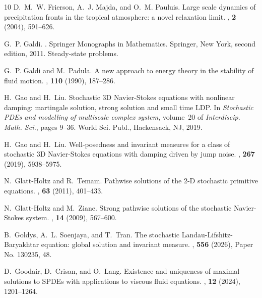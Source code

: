\documentclass[11pt, reqno]{amsart}
\theoremstyle{definition}
\numberwithin{equation}{section}
\begin{document}
\begin{thebibliography}{10}
	D.~M.~W. Frierson, A.~J. Majda, and O.~M. Pauluis.
	\newblock Large scale dynamics of precipitation fronts in the tropical
	atmosphere: a novel relaxation limit.
	,  {\bf 2} (2004), 591--626.
	
	G.~P. Galdi.
	.
	\newblock Springer Monographs in Mathematics. Springer, New York, second
	edition, 2011.
	\newblock Steady-state problems.
	
	G.~P. Galdi and M.~Padula.
	\newblock A new approach to energy theory in the stability of fluid motion.
	,  {\bf 110} (1990), 187--286.
	
	H.~Gao and H.~Liu.
	\newblock Stochastic 3{D} {N}avier-{S}tokes equations with nonlinear damping:
	martingale solution, strong solution and small time {LDP}.
	\newblock In {\em Stochastic {PDE}s and modelling of multiscale complex
		system}, volume~20 of {\em Interdiscip. Math. Sci.}, pages 9--36. World Sci.
	Publ., Hackensack, NJ, 2019.
	
	H.~Gao and H.~Liu.
	\newblock Well-posedness and invariant measures for a class of stochastic 3{D}
	{N}avier-{S}tokes equations with damping driven by jump noise.
	,  {\bf 267} (2019), 5938--5975.
	
	N.~Glatt-Holtz and R.~Temam.
	\newblock Pathwise solutions of the 2-{D} stochastic primitive equations.
	,  {\bf 63} (2011), 401--433.
	
	N.~Glatt-Holtz and M.~Ziane.
	\newblock Strong pathwise solutions of the stochastic {N}avier-{S}tokes system.
	,  {\bf 14} (2009), 567--600.
	
	B.~Goldys, A.~L. Soenjaya, and T.~Tran.
	\newblock The stochastic {L}andau-{L}ifshitz-{B}aryakhtar equation: global
	solution and invariant measure.
	,  {\bf 556} (2026), Paper No. 130235, 48.
	
	D.~Goodair, D.~Crisan, and O.~Lang.
	\newblock Existence and uniqueness of maximal solutions to {SPDE}s with
	applications to viscous fluid equations.
	,  {\bf 12} (2024),
	1201--1264.
	

\end{thebibliography}
\end{document}
